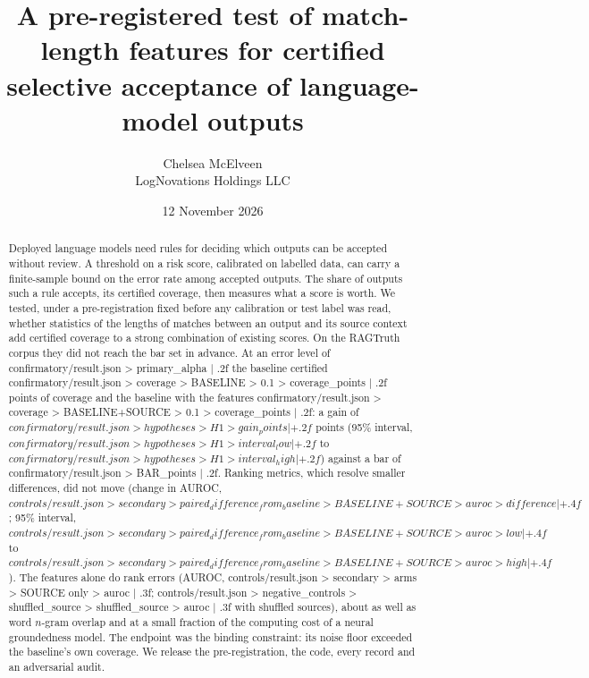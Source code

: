 \documentclass[11pt]{article}
\title{\textbf{A pre-registered test of match-length features for certified selective acceptance of language-model outputs}}
\author{Chelsea McElveen\\[2pt]{\small LogNovations Holdings LLC}}
\date{12 November 2026}
\begin{document}
\maketitle

\begin{abstract}
\noindent Deployed language models need rules for deciding which outputs can be accepted without review. A threshold on a risk score, calibrated on labelled data, can carry a finite-sample bound on the error rate among accepted outputs. The share of outputs such a rule accepts, its certified coverage, then measures what a score is worth. We tested, under a pre-registration fixed before any calibration or test label was read, whether statistics of the lengths of matches between an output and its source context add certified coverage to a strong combination of existing scores. On the RAGTruth corpus they did not reach the bar set in advance. At an error level of {{confirmatory/result.json > primary_alpha | .2f}} the baseline certified {{confirmatory/result.json > coverage > BASELINE > 0.1 > coverage_points | .2f}} points of coverage and the baseline with the features {{confirmatory/result.json > coverage > BASELINE+SOURCE > 0.1 > coverage_points | .2f}}: a gain of ${{confirmatory/result.json > hypotheses > H1 > gain_points | +.2f}}$ points (95\% interval, ${{confirmatory/result.json > hypotheses > H1 > interval_low | +.2f}}$ to ${{confirmatory/result.json > hypotheses > H1 > interval_high | +.2f}}$) against a bar of {{confirmatory/result.json > BAR_points | .2f}}. Ranking metrics, which resolve smaller differences, did not move (change in AUROC, ${{controls/result.json > secondary > paired_difference_from_baseline > BASELINE+SOURCE > auroc > difference | +.4f}}$; 95\% interval, ${{controls/result.json > secondary > paired_difference_from_baseline > BASELINE+SOURCE > auroc > low | +.4f}}$ to ${{controls/result.json > secondary > paired_difference_from_baseline > BASELINE+SOURCE > auroc > high | +.4f}}$). The features alone do rank errors (AUROC, {{controls/result.json > secondary > arms > SOURCE only > auroc | .3f}}; {{controls/result.json > negative_controls > shuffled_source > shuffled_source > auroc | .3f}} with shuffled sources), about as well as word $n$-gram overlap and at a small fraction of the computing cost of a neural groundedness model. The endpoint was the binding constraint: its noise floor exceeded the baseline's own coverage. We release the pre-registration, the code, every record and an adversarial audit.
\end{abstract}
\end{document}
